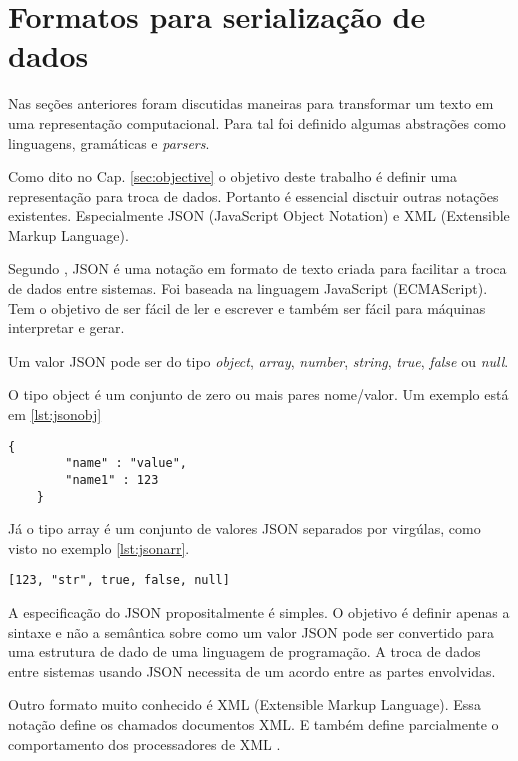 \section{Formatos para serialização de dados}

Nas seções anteriores foram discutidas maneiras para transformar um texto 
em uma representação computacional. Para tal foi definido algumas abstrações
como linguagens, gramáticas e \textit{parsers}.

Como dito no Cap. \ref{sec:objective} o objetivo deste trabalho é definir
uma representação para troca de dados. Portanto é essencial disctuir outras
notações existentes. Especialmente JSON (JavaScript Object Notation) e 
XML (Extensible Markup Language).

Segundo , JSON é uma notação em formato de texto criada para facilitar 
a troca de dados entre sistemas. Foi baseada na linguagem JavaScript (ECMAScript). 
Tem o objetivo de ser fácil de ler e escrever e também ser fácil para máquinas interpretar e gerar.

Um valor JSON pode ser do tipo \textit{object}, \textit{array}, \textit{number}, \textit{string}, 
\textit{true}, \textit{false} ou \textit{null}. 

O tipo object é um conjunto de zero ou mais pares nome/valor. Um exemplo está em \ref{lst:jsonobj}

\begin{lstlisting}[caption=Exemplo de JSON Object,label={lst:jsonobj}]
    {
        "name" : "value",
        "name1" : 123
    }
\end{lstlisting}

Já o tipo array é um conjunto de valores JSON separados por virgúlas, como visto no exemplo \ref{lst:jsonarr}.

\begin{lstlisting}[caption=Exemplo de JSON Array,label={lst:jsonarr}]
    [123, "str", true, false, null]
\end{lstlisting}

A especificação do JSON propositalmente é simples. O objetivo é definir apenas a sintaxe e não a semântica
sobre como um valor JSON pode ser convertido para uma estrutura de dado de uma linguagem de programação.
A troca de dados entre sistemas usando JSON necessita de um acordo entre as partes envolvidas.

Outro formato muito conhecido é XML (Extensible Markup Language). Essa notação define os chamados documentos XML.
E também define parcialmente o comportamento dos processadores de XML \cite{XML}. 

